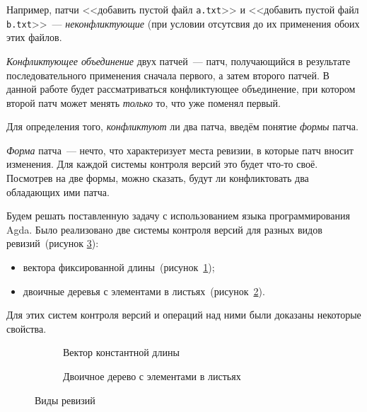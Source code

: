 Например, патчи <<добавить пустой файл \texttt{a.txt}>> и <<добавить
пустой файл \texttt{b.txt}>>~--- \emph{неконфликтующие} (при условии
отсутсвия до их применения обоих этих файлов.

\begin{definition}
  \emph{Конфликтующее объединение} двух патчей~--- патч, получающийся
  в результате последовательного применения сначала первого, а затем
  второго патчей. В данной работе будет рассматриваться конфликтующее
  объединение, при котором второй патч может менять \emph{только} то,
  что уже поменял первый.
\end{definition}

Для определения того, \emph{конфликтуют} ли два патча, введём понятие
\emph{формы} патча.

\begin{definition}
  \emph{Форма} патча~--- нечто, что характеризует места ревизии, в
  которые патч вносит изменения. Для каждой системы контроля версий
  это будет что-то своё. Посмотрев на две формы, можно сказать, будут
  ли конфликтовать два обладающих ими патча.
\end{definition}

Будем решать поставленную задачу с использованием языка
программирования Agda. Было реализовано две системы контроля версий
для разных видов ревизий~(рисунок \ref{fig:repotypes}): 
\begin{itemize}
\item вектора фиксированной длины~(рисунок~\ref{fig:repotypes-vec});
\item двоичные деревья с элементами в
  листьях~(рисунок~\ref{fig:repotypes-tree}).
\end{itemize}

Для этих систем контроля версий и операций над ними были доказаны
некоторые свойства.

\begin{figure}
  \centering
  \begin{subfigure}[b]{0.45\textwidth}
    \centering
    \caption{Вектор константной длины}
    \label{fig:repotypes-vec}
  \end{subfigure}
  \begin{subfigure}[b]{0.45\textwidth}
    \centering
    \caption{Двоичное дерево с элементами в листьях}
    \label{fig:repotypes-tree}
  \end{subfigure}
  \caption{Виды ревизий}
  \label{fig:repotypes}
\end{figure}

